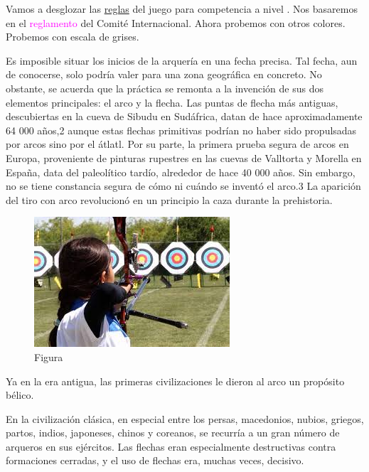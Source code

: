 \documentclass[12pt, legalpaper, twocolumn]{article}
\begin{document}
\begin{flushleft}
\blindtext
\end{flushleft}

\begin{center}
    
Vamos a desglozar las \uline{reglas} del juego para competencia a nivel . Nos basaremos en el \textcolor{magenta}{reglamento} del Comité    \textcolor{miguel}{Internacional}. Ahora probemos con otros \textcolor{color2}{colores}. Probemos con escala de \textcolor{color3}{grises.} 
\end{center}


\newpage

Es imposible situar los inicios de la arquería en una fecha precisa. Tal fecha, aun de conocerse, solo podría valer para una zona geográfica en concreto. No obstante, se acuerda que la práctica se remonta a la invención de sus dos elementos principales: el arco y la flecha. Las puntas de flecha más antiguas, descubiertas en la cueva de Sibudu en Sudáfrica, datan de hace aproximadamente 64 000 años,2 aunque estas flechas primitivas podrían no haber sido propulsadas por arcos sino por el átlatl. Por su parte, la primera prueba segura de arcos en Europa, proveniente de pinturas rupestres en las cuevas de Valltorta y Morella en España, data del paleolítico tardío, alrededor de hace 40 000 años. Sin embargo, no se tiene constancia segura de cómo ni cuándo se inventó el arco.3 La aparición del tiro con arco revolucionó en un principio la caza durante la prehistoria.

\begin{figure}[H]
    \centering
    \includegraphics[scale=1]{tiro_arco.jpg} 
    \caption{Figura}
    \label{fig:enter-label}
\end{figure}

Ya en la era antigua, las primeras civilizaciones le dieron al arco un propósito bélico.

En la civilización clásica, en especial entre los persas, macedonios, nubios, griegos, partos, indios, japoneses, chinos y coreanos, se recurría a un gran número de arqueros en sus ejércitos. Las flechas eran especialmente destructivas contra formaciones cerradas, y el uso de flechas era, muchas veces, decisivo.
\end{document}
